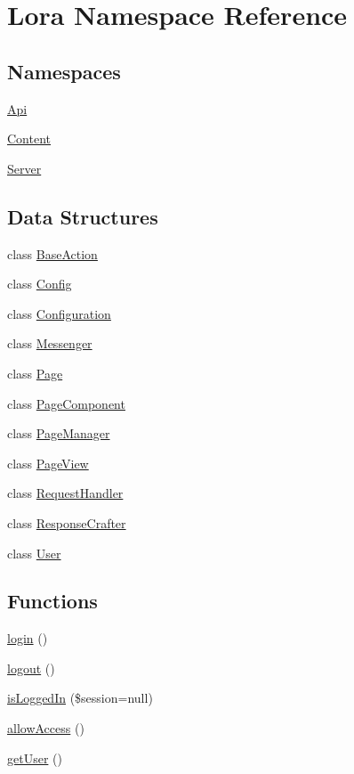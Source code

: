 \hypertarget{namespace_lora}{}\section{Lora Namespace Reference}
\label{namespace_lora}
\subsection*{Namespaces}
\begin{DoxyCompactItemize}
\item 
 \hyperlink{namespace_lora_1_1_api}{Api}
\item 
 \hyperlink{namespace_lora_1_1_content}{Content}
\item 
 \hyperlink{namespace_lora_1_1_server}{Server}
\end{DoxyCompactItemize}
\subsection*{Data Structures}
\begin{DoxyCompactItemize}
\item 
class \hyperlink{class_lora_1_1_base_action}{Base\+Action}
\item 
class \hyperlink{class_lora_1_1_config}{Config}
\item 
class \hyperlink{class_lora_1_1_configuration}{Configuration}
\item 
class \hyperlink{class_lora_1_1_messenger}{Messenger}
\item 
class \hyperlink{class_lora_1_1_page}{Page}
\item 
class \hyperlink{class_lora_1_1_page_component}{Page\+Component}
\item 
class \hyperlink{class_lora_1_1_page_manager}{Page\+Manager}
\item 
class \hyperlink{class_lora_1_1_page_view}{Page\+View}
\item 
class \hyperlink{class_lora_1_1_request_handler}{Request\+Handler}
\item 
class \hyperlink{class_lora_1_1_response_crafter}{Response\+Crafter}
\item 
class \hyperlink{class_lora_1_1_user}{User}
\end{DoxyCompactItemize}
\subsection*{Functions}
\begin{DoxyCompactItemize}
\item 
\hyperlink{namespace_lora_a6334cdbb86812dbd18f093463e7c3023}{login} ()
\item 
\hyperlink{namespace_lora_a801b7854cd8f787f174a6b501bf517bb}{logout} ()
\item 
\hyperlink{namespace_lora_a538956ba5c1427dd64c41ea1cdc5bddb}{is\+Logged\+In} (\$session=null)
\item 
\hyperlink{namespace_lora_a94879a930ed3b8684851ff98e9220a27}{allow\+Access} ()
\item 
\hyperlink{namespace_lora_a881d230aaa8a5510d5c80f0ed1497129}{get\+User} ()
\end{DoxyCompactItemize}


